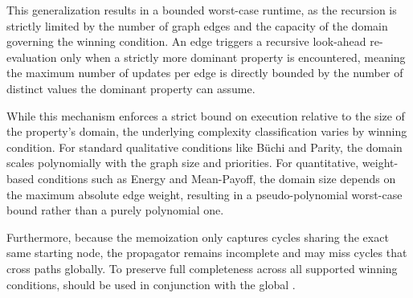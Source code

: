 \documentclass[a4paper,fleqn]{cas-sc}
\begin{document}
This generalization results in a bounded worst-case runtime, as the recursion is strictly limited by the number of graph edges and the capacity of the domain governing the winning condition. An edge triggers a recursive look-ahead re-evaluation only when a strictly more dominant property is encountered, meaning the maximum number of updates per edge is directly bounded by the number of distinct values the dominant property can assume.

While this mechanism enforces a strict bound on execution relative to the size of the property's domain, the underlying complexity classification varies by winning condition. For standard qualitative conditions like Büchi and Parity, the domain scales polynomially with the graph size and priorities. For quantitative, weight-based conditions such as Energy and Mean-Payoff, the domain size depends on the maximum absolute edge weight, resulting in a pseudo-polynomial worst-case bound rather than a purely polynomial one.

Furthermore, because the memoization only captures cycles sharing the exact same starting node, the propagator remains incomplete and may miss cycles that cross paths globally. To preserve full completeness across all supported winning conditions, \nocmemo should be used in conjunction with the global \nocchecker.
\end{document}
